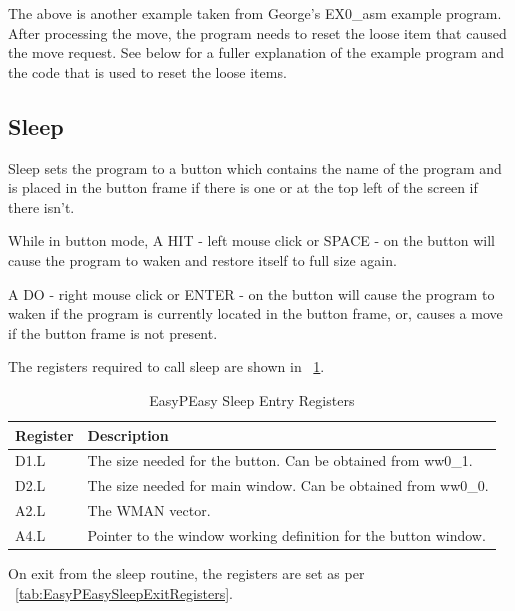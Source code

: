 The above is another example taken from George's
 EX0\_asm example program. After processing the move, the
            program needs to reset the loose item that caused the move request. See below
            for a fuller explanation of the example program and the code that is used to
            reset the loose items.

\subsection{Sleep}
\label{ch26-sub-sleep}%

Sleep sets the program to a button which contains the name of the
            program and is placed in the button frame if there is one or at the top left
            of the screen if there isn't.

While in button mode, A HIT -{} left mouse click or SPACE -{} on the button
            will cause the program to waken and restore itself to full size again.

A DO -{} right mouse click or ENTER -{} on the button will cause the program
            to waken if the program is currently located in the button frame, or, causes a
            move if the button frame is not present.

The registers required to call sleep are shown in \tablename~\ref{tab:EasyPEasySleepEntryRegisters}.

\begin{table}[htbp]
\centering
\begin{tabular}{l p{}}
\toprule
\textbf{Register} & \textbf{Description}  \\
\midrule
%
D1.L & The size needed for the button. Can be obtained from ww0\_1.\\
D2.L & The size needed for main window. Can be obtained from ww0\_0.\\
A2.L & The WMAN vector.\\
A4.L & Pointer to the window working definition for the button window.\\
%
\bottomrule
\end{tabular}
\caption{EasyPEasy Sleep Entry Registers}
\label{tab:EasyPEasySleepEntryRegisters}
\end{table}


On exit from the sleep routine, the registers are set as per \tablename~\ref{tab:EasyPEasySleepExitRegisters}.

